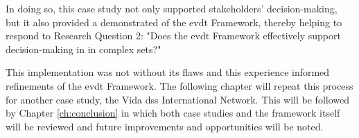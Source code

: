 In doing so, this case study not only supported stakeholders' decision-making, but it also provided a demonstrated of the \ac{evdt} Framework, thereby helping to respond to Research Question 2: "Does the \ac{evdt} Framework effectively support decision-making in in complex \ac{sets}?"

This implementation was not without its flaws and this experience informed refinements of the \ac{evdt} Framework. The following chapter will repeat this process for another case study, the Vida \ac{dss} International Network. This will be followed by Chapter \ref{ch:conclusion} in which both case studies and the framework itself will be reviewed and future improvements and opportunities will be noted.




